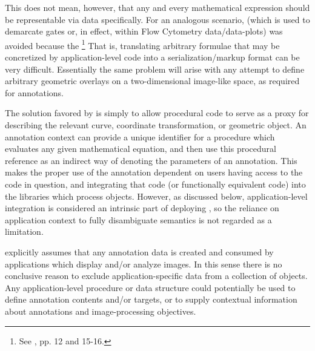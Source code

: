 {\begin{description}
This does not mean, however, that any and every 
mathematical expression should be representable 
via \AXFI{} data specifically.  For an analogous 
scenario, \GatingML{} (which is used to 
demarcate gates or, in effect,  within 
Flow Cytometry data/data-plots)  
was avoided because the \footnote{See , pp. 12 
and 15-16.}  That is, translating arbitrary 
formulae that may be concretized by application-level 
code into a serialization/markup format can be very 
difficult.  Essentially the same problem will arise 
with any attempt to define arbitrary geometric 
overlays on a two-dimensional image-like space, 
as required for \AXFI{} annotations. 

The solution favored by \AXFI{} is simply to allow 
procedural code to serve as a proxy for describing 
the relevant curve, coordinate transformation, or 
geometric object.  An \AXFI{} annotation context 
can provide a unique identifier for a procedure 
which evaluates any given mathematical equation, 
and then use this procedural reference as 
an indirect way of denoting the parameters of 
an annotation.  This makes the proper use 
of the annotation dependent on users having 
access to the code in question, and integrating 
that code (or functionally equivalent code) 
into the libraries which process \AXFI{} 
objects.  However, as discussed below, 
application-level integration is considered 
an intrinsic part of deploying \AXFI{}, so 
the reliance on application context to 
fully disambiguate \AXFI{} semantics is 
not regarded as a limitation.

\item[Application-Level Algorithms, Procedures, 
and Data Types]  \lAXFI{} explicitly assumes 
that any annotation data is created and consumed 
by applications which display and/or analyze 
images.  In this sense there is no 
conclusive reason to exclude application-specific 
data from a collection of \AXFI{} objects.  
Any application-level procedure or data structure  
could potentially be used to define annotation 
contents and/or targets, or to supply contextual 
information about annotations and image-processing 
objectives.  


\end{description}}
